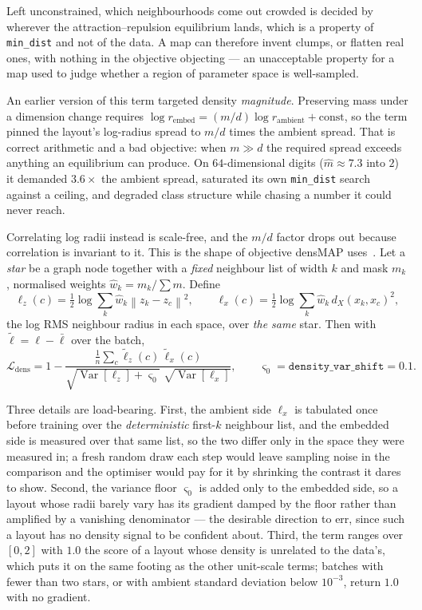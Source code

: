 \documentclass[12pt]{iopart}
\theoremstyle{definition}
\theoremstyle{plain}
\theoremstyle{remark}
\newcommand{\norm}[1]{\left\lVert#1\right\rVert}
\DeclareMathOperator{\Var}{Var}
\newcommand{\loss}{\mathcal{L}}
\newcommand{\code}[1]{\texttt{#1}}
\begin{document}
Left unconstrained, which neighbourhoods come out crowded is decided by
wherever the attraction--repulsion equilibrium lands, which is a property of
\code{min\_dist} and not of the data. A map can therefore invent clumps, or
flatten real ones, with nothing in the objective objecting --- an unacceptable
property for a map used to judge whether a region of parameter space is
well-sampled.

An earlier version of this term targeted density \emph{magnitude}. Preserving
mass under a dimension change requires
$\log r_{\mathrm{embed}}=(m/d)\log r_{\mathrm{ambient}}+\text{const}$, so the
term pinned the layout's log-radius spread to $m/d$ times the ambient spread.
That is correct arithmetic and a bad objective: when $m\gg d$ the required
spread exceeds anything an equilibrium can produce. On $64$-dimensional digits
($\hat m\approx 7.3$ into $2$) it demanded $3.6\times$ the ambient spread,
saturated its own \code{min\_dist} search against a ceiling, and degraded class
structure while chasing a number it could never reach.

Correlating log radii instead is scale-free, and the $m/d$ factor drops out
because correlation is invariant to it. This is the shape of objective densMAP
uses~\cite{narayan2021densmap}. Let a \emph{star} be a graph node together with
a \emph{fixed} neighbour list of width $k$ and mask $m_k$, normalised weights
$\hat w_k=m_k/\sum m$. Define
\begin{equation}
\label{eq:logr}
\ell_z(c)
=
\tfrac12\log\sum_k \hat w_k\norm{z_k-z_c}^2,
\qquad
\ell_x(c)
=
\tfrac12\log\sum_k \hat w_k\,d_X(x_k,x_c)^2,
\end{equation}
the log RMS neighbour radius in each space, over \emph{the same} star. Then
with $\tilde\ell=\ell-\bar\ell$ over the batch,
\begin{equation}
\label{eq:dens}
\loss_{\mathrm{dens}}
=
1
-
\frac{\frac1n\sum_c\tilde\ell_z(c)\,\tilde\ell_x(c)}
     {\sqrt{\Var[\ell_z]+\varsigma_0}\;\sqrt{\Var[\ell_x]}},
\qquad
\varsigma_0=\code{density\_var\_shift}=0.1 .
\end{equation}

Three details are load-bearing. First, the ambient side $\ell_x$ is tabulated
once before training over the \emph{deterministic} first-$k$ neighbour list, and
the embedded side is measured over that same list, so the two differ only in the
space they were measured in; a fresh random draw each step would leave sampling
noise in the comparison and the optimiser would pay for it by shrinking the
contrast it dares to show. Second, the variance floor $\varsigma_0$ is added
only to the embedded side, so a layout whose radii barely vary has its gradient
damped by the floor rather than amplified by a vanishing denominator --- the
desirable direction to err, since such a layout has no density signal to be
confident about. Third, the term ranges over $[0,2]$ with $1.0$ the score of a
layout whose density is unrelated to the data's, which puts it on the same
footing as the other unit-scale terms; batches with fewer than two stars, or
with ambient standard deviation below $10^{-3}$, return $1.0$ with no gradient.
\end{document}
